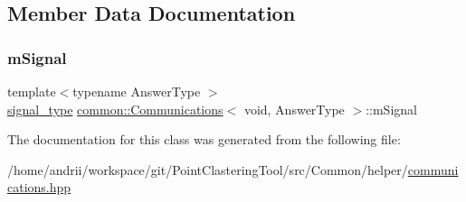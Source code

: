 \subsection{Member Data Documentation}
\mbox{\label{classcommon_1_1Communications_3_01void_00_01AnswerType_01_4_ab80bea13198739a77ad862c570c458b4}} 
\subsubsection{\texorpdfstring{m\+Signal}{mSignal}}
{\footnotesize\ttfamily template$<$typename Answer\+Type $>$ \\
\mbox{\hyperlink{classcommon_1_1Communications_3_01void_00_01AnswerType_01_4_aa7d23e7da9af7eb33112dc11fd3ec8aa}{signal\+\_\+type}} \mbox{\hyperlink{classcommon_1_1Communications}{common\+::\+Communications}}$<$ void, Answer\+Type $>$\+::m\+Signal\hspace{0.3cm}{\ttfamily [private]}}



The documentation for this class was generated from the following file\+:\begin{DoxyCompactItemize}
\item 
/home/andrii/workspace/git/\+Point\+Clastering\+Tool/src/\+Common/helper/\mbox{\hyperlink{communications_8hpp}{communications.\+hpp}}\end{DoxyCompactItemize}
